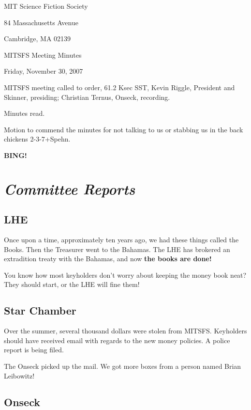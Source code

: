 \documentclass[10pt]{article}
\newcommand{\bing}{{\bf BING!} }
\newcommand{\goto}[1]{\bing \vskip 12pt \section*{{\em{#1}}}}
\begin{document}
\begin{center}

MIT Science Fiction Society

84 Massachusetts Avenue

Cambridge, MA 02139

\vspace{12pt}

MITSFS Meeting Minutes

Friday, November 30, 2007

\end{center}

\vspace{18pt}

\setlength{\parskip}{6pt}

\noindent
MITSFS meeting called to order, 61.2 Ksec SST,
Kevin Riggle, President and Skinner, presiding; Christian Ternus, Onseck, recording.

Minutes read.

Motion to commend the minutes for not talking to us or stabbing us in the back chickens 2-3-7+Spehn.

\BING

\goto{Committee Reports}

\subsection*{LHE}

Once upon a time, approximately ten years ago, we had these things called the Books.  Then the Treasurer went to the Bahamas.  The LHE has brokered an extradition treaty with the Bahamas, and now \textbf{the books are done!}

You know how most keyholders don't worry about keeping the money book neat?  They should start, or the LHE will fine them!

\subsection*{Star Chamber}

Over the summer, several thousand dollars were stolen from MITSFS.  Keyholders should have received email with regards to the new money policies.  A police report is being filed.

The Onseck picked up the mail.  We got more boxes from a person named Brian Leibowitz!

\subsection*{Onseck}
\end{document}
